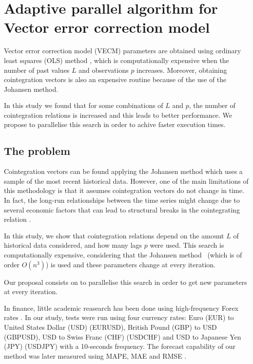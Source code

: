 
\chapter{Adaptive parallel algorithm for Vector error correction model}

\vspace{0.5cm} 

Vector error correction model (VECM) parameters are obtained using ordinary
least squares (OLS) method \cite{golub1980}, which is computationally expensive
when the number of past values $L$ and observations $p$ increases. Moreover,
obtaining cointegration vectors is also an expensive routine because of the use
of the Johansen method.

In this study we found that for some combinations of $L$ and $p$, the number of
cointegration relations is increased and this leads to better performance. We
propose to parallelise this search in order to achive faster execution times.


\section{The problem} \label{sec:proposal}

Cointegration vectors can be found applying the Johansen method which uses a
sample of the most recent historical data. However, one of the main limitations of this
methodology is that it assumes cointegration vectors do not change in time.  In
fact, the long-run relationships between the time series might change due to
several economic factors that can lead to structural breaks in the cointegrating
relation \cite{gregoryETal1996}. 

In this study, we show that cointegration relations depend on the amount $L$ of
historical data considered, and how many lags $p$ were used. This search is
computationally expensive, considering that the Johansen
method~\cite{johansen1995} (which is of order $O(n^3)$) is used and these
parameters change at every iteration. 

Our proposal consists on to parallelise this search in order to get new
parameters at every iteration. 

In finance, little academic reasearch has been done using high-frequency Forex
rates \cite{Bekiros2015}. In our study, tests were run using four currency
rates: Euro (EUR) to United States Dollar (USD) (EURUSD), British Pound (GBP) to
USD (GBPUSD), USD to Swiss Franc (CHF) (USDCHF) and USD to Japanese Yen (JPY)
(USDJPY) with a 10-seconds frequency.  The forecast capability of our method was
later measured using MAPE, MAE and RMSE \cite{armstrong1992}. 


